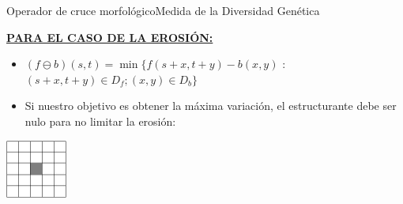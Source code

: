 \documentclass[10pt]{beamer}
\begin{document}
		
		\begin{frame}{Operador de cruce morfol\'ogico}{Medida de la Diversidad Gen\'etica}
			\begin{center}
				\underline{\textbf{PARA EL CASO DE LA EROSI\'ON:}}
				
				\begin{itemize}
					\item $(f \ominus b)(s,t) = \min \{f(s+x, t+y)-b(x,y)$ : $(s+x, t+y) \in D_{f} ; (x,y) \in D_{b} \} $
				\end{itemize}
				
					
					\begin{itemize}
						\item Si nuestro objetivo es obtener la m\'axima variaci\'on, el estructurante debe ser nulo para no limitar la erosi\'on:
					\end{itemize}
					
					\includegraphics[width = 2cm]{matriz_pixel} 
					
				\end{center}
			\end{frame}
			
\end{document}
